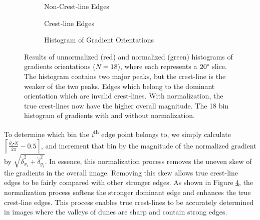   \begin{figure}
  	\centering
  	\begin{subfigure}{0.48\textwidth}
  		\centering
  		\caption{Non-Crest-line Edges}
  		\label{fig:false_dominant_orientation_image}
  	\end{subfigure}
  	\begin{subfigure}{0.48\textwidth}
  		\centering
  		\caption{Crest-line Edges}
  		\label{fig:true_dominant_orientation_image}
  	\end{subfigure}
  	\begin{subfigure}{\textwidth}
  		\centering
  		\caption{Histogram of Gradient Orientations}
  		\label{fig:dominant_orientation_histogram}
  	\end{subfigure}
  	\caption{Results of unnormalized (red) and normalized (green) histograms of gradients orientations ($N=18$), where each represents a $20\degree$ slice. The histogram contains two major peaks, but the crest-line is the weaker of the two peaks.  Edges which belong to the dominant orientation which are invalid crest-lines.  With normalization, the true crest-lines now have the higher overall magnitude.  The 18 bin histogram of gradients with and without normalization.}
  	\label{fig:computing_dominant_orientation}
  \end{figure}
  
  To determine which bin the \emph{i}\textsuperscript{th} edge point belongs to, we simply calculate $\left\lceil \frac{\dot{\theta_{i}}\centerdot N}{2\pi}-0.5\right\rceil $,	and increment that bin by the magnitude of the normalized gradient	by $\sqrt{\dot{\delta}_{x_{i}}^{2}+\dot{\delta}_{y_{i}}^{2}}$. In essence, this normalization process removes the uneven skew of the gradients in the overall image. Removing this skew allows true crest-line edges to be fairly compared with other stronger edges. As shown in Figure \ref{fig:computing_dominant_orientation}, the normalization process softens the stronger dominant edge and enhances the true crest-line edges. This process enables true crest-lines to be accurately determined in images where the valleys of dunes are sharp and contain strong edges.
  
